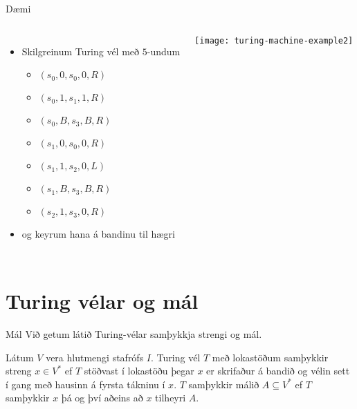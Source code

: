 \documentclass{beamer}
\begin{document}
\begin{frame}{Dæmi}
\begin{columns}
\begin{itemize}
 \item Skilgreinum Turing vél með $5$-undum
 \begin{itemize}
  \item $(s_0 , 0, s_0 , 0, R)$
  \item $(s_0 , 1, s_1 , 1, R)$
  \item $(s_0 , B, s_3 , B, R)$
  \item $(s_1 , 0, s_0 , 0, R)$
  \item $(s_1 , 1, s_2 , 0, L)$
  \item $(s_1 , B, s_3 , B, R)$
  \item $(s_2 , 1, s_3 , 0, R)$
 \end{itemize}
 \item og keyrum hana á bandinu til hægri
\end{itemize}
\begin{center}
\texttt{[image: turing-machine-example2]}
\end{center}
\end{columns}
\end{frame}

\section{Turing vélar og mál}

\begin{frame}{Mál}
Við getum látið Turing-vélar samþykkja strengi og mál.

\begin{tcolorbox}
Látum $V$ vera hlutmengi stafrófs $I$. Turing vél $T$ með lokastöðum samþykkir streng $x \in V^*$ ef $T$ stöðvast í lokastöðu þegar $x$ er skrifaður á bandið og vélin sett í gang með hausinn á fyrsta tákninu í $x$. $T$ samþykkir málið $A \subseteq V^*$ ef $T$ samþykkir $x$ þá og því aðeins að $x$ tilheyri $A$.
\end{tcolorbox}

\end{frame}
\end{document}
